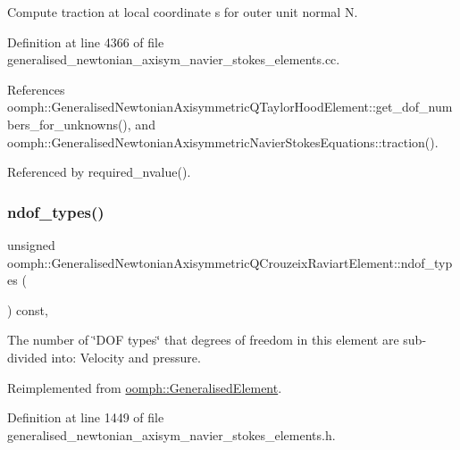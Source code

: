 Compute traction at local coordinate s for outer unit normal N. 



Definition at line 4366 of file generalised\+\_\+newtonian\+\_\+axisym\+\_\+navier\+\_\+stokes\+\_\+elements.\+cc.



References oomph\+::\+Generalised\+Newtonian\+Axisymmetric\+Q\+Taylor\+Hood\+Element\+::get\+\_\+dof\+\_\+numbers\+\_\+for\+\_\+unknowns(), and oomph\+::\+Generalised\+Newtonian\+Axisymmetric\+Navier\+Stokes\+Equations\+::traction().



Referenced by required\+\_\+nvalue().

\mbox{\label{classoomph_1_1GeneralisedNewtonianAxisymmetricQCrouzeixRaviartElement_adabb660209259f2ac02d996e8401fc34}} 
\subsubsection{\texorpdfstring{ndof\+\_\+types()}{ndof\_types()}}
{\footnotesize\ttfamily unsigned oomph\+::\+Generalised\+Newtonian\+Axisymmetric\+Q\+Crouzeix\+Raviart\+Element\+::ndof\+\_\+types (\begin{DoxyParamCaption}{ }\end{DoxyParamCaption}) const\hspace{0.3cm}{\ttfamily [inline]}, {\ttfamily [virtual]}}



The number of \char`\"{}\+D\+O\+F types\char`\"{} that degrees of freedom in this element are sub-\/divided into\+: Velocity and pressure. 



Reimplemented from \hyperlink{classoomph_1_1GeneralisedElement_a0c6037a870597b35dcf1c780710b9a56}{oomph\+::\+Generalised\+Element}.



Definition at line 1449 of file generalised\+\_\+newtonian\+\_\+axisym\+\_\+navier\+\_\+stokes\+\_\+elements.\+h.



